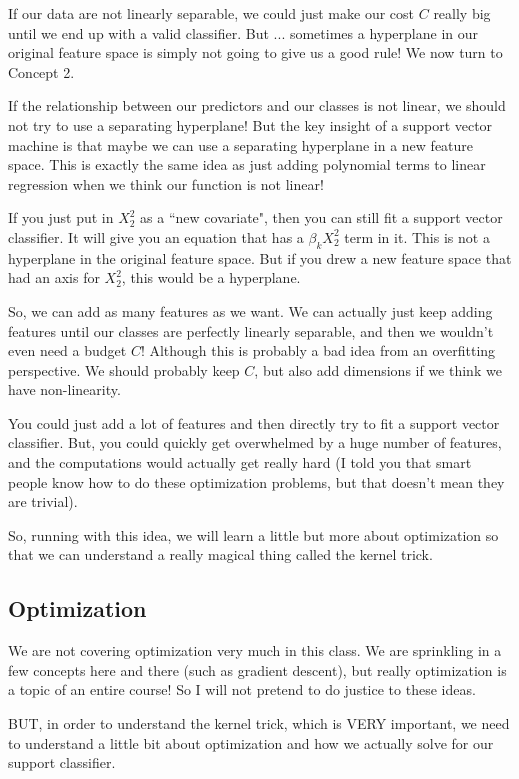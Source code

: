 If our data are not linearly separable, we could just make our cost $C$ really big until we end up with a valid classifier. But ... sometimes a hyperplane in our original feature space is simply not going to give us a good rule! We now turn to Concept 2. 

If the relationship between our predictors and our classes is not linear, we should not try to use a separating hyperplane! But the key insight of a support vector machine is that maybe we can use a separating hyperplane in a new feature space. This is exactly the same idea as just adding polynomial terms to linear regression when we think our function is not linear!

If you just put in $X_2^2$ as a ``new covariate", then you can still fit a support vector classifier. It will give you an equation that has a $\beta_k X_2^2$ term in it. This is not a hyperplane in the original feature space. But if you drew a new feature space that had an axis for $X_2^2$, this would be a hyperplane. 

So, we can add as many features as we want. We can actually just keep adding features until our classes are perfectly linearly separable, and then we wouldn't even need a budget $C$! Although this is probably a bad idea from an overfitting perspective. We should probably keep $C$, but also add dimensions if we think we have non-linearity. 

You could just add a lot of features and then directly try to fit a support vector classifier. But, you could quickly get overwhelmed by a huge number of features, and the computations would actually get really hard (I told you that smart people know how to do these optimization problems, but that doesn't mean they are trivial).

So, running with this idea, we will learn a little but more about optimization so that we can understand a really magical thing called the kernel trick. 

\subsection{Optimization}

We are not covering optimization very much in this class. We are sprinkling in a few concepts here and there (such as gradient descent), but really optimization is a topic of an entire course! So I will not pretend to do justice to these ideas.

BUT, in order to understand the kernel trick, which is VERY important, we need to understand a little bit about optimization and how we actually solve for our support classifier.

